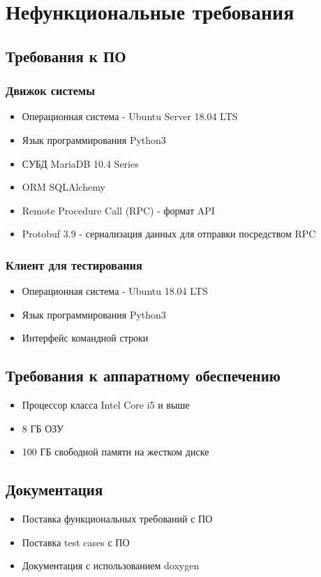 \section{Нефункциональные требования}

\subsection{Требования к ПО}
\subsubsection{Движок системы}
\begin{itemize}
    \item Операционная система - Ubuntu Server 18.04 LTS
    \item Язык программирования Python3
    \item СУБД MariaDB 10.4 Series
    \item ORM SQLAlchemy
    \item Remote Procedure Call (RPC) - формат API
    \item Protobuf 3.9 - сериализация данных для отправки посредством RPC
\end{itemize}
\subsubsection{Клиент для тестирования}
\begin{itemize}
    \item Операционная система - Ubuntu 18.04 LTS
    \item Язык программирования Python3
    \item Интерфейс командной строки
\end{itemize}

\subsection{Требования к аппаратному обеспечению}
\begin{itemize}
    \item Процессор класса Intel Core i5 и выше
    \item 8 ГБ ОЗУ
    \item 100 ГБ свободной памяти на жестком диске
\end{itemize}

 
\subsection{Документация}
\begin{itemize}
    \item Поставка функциональных требований с ПО 
    \item Поставка test cases с ПО 
    \item Документация с использованием doxygen
\end{itemize}

\newpage

